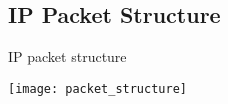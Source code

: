 \begin{landscape}
\chapter{\ac{IP} Packet Structure}
\label{chp:ip_packet}
\begin{table}
\caption{\ac{IP} packet structure}
\label{tbl:packet_structure}
\centering
\texttt{[image: packet\_structure]}
\end{table}
\end{landscape}

